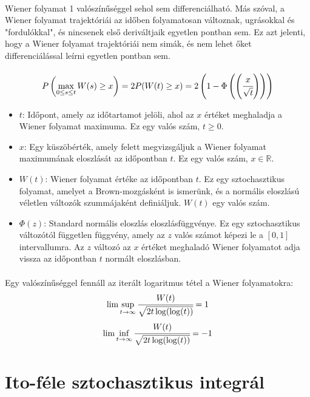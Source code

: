 \documentclass[11pt,a4paper]{article}
\begin{document}
				\paragraph{}
					Wiener folyamat 1 valószínűséggel sehol sem differenciálható. Más szóval, a Wiener folyamat trajektóriái az időben folyamatosan változnak, ugrásokkal és "fordulókkal", és nincsenek első deriváltjaik egyetlen pontban sem. Ez azt jelenti, hogy a Wiener folyamat trajektóriái nem simák, és nem lehet őket differenciálással leírni egyetlen pontban sem.
				\paragraph{}
					$$P\left( \max_{0 \le s \le t} W(s) \ge x\right) = 2P(W(t) \ge x) = 2 \left( 1- \Phi\left(\left( \cfrac{x}{\sqrt{t}} \right)\right) \right) $$
					\begin{itemize}
						\item $t$: Időpont, amely az időtartamot jelöli, ahol az $x$ értéket meghaladja a Wiener folyamat maximuma. Ez egy valós szám, $t \geq 0$.
						\item $x$: Egy küszöbérték, amely felett megvizsgáljuk a Wiener folyamat maximumának eloszlását az időpontban $t$. Ez egy valós szám, $x \in \mathbb{R}$.
						\item $W(t)$: Wiener folyamat értéke az időpontban $t$. Ez egy sztochasztikus folyamat, amelyet a Brown-mozgásként is ismerünk, és a normális eloszlású véletlen változók szummájaként definiáljuk. $W(t)$ egy valós szám.
						\item $\Phi(z)$: Standard normális eloszlás eloszlásfüggvénye. Ez egy sztochasztikus változótól független függvény, amely az $z$ valós számot képezi le a $[0,1]$ intervallumra. Az $z$ változó az $x$ értéket meghaladó Wiener folyamatot adja vissza az időpontban $t$ normált eloszlásban.
					\end{itemize}
				\paragraph{}
					Egy valószínűséggel fennáll az iterált logaritmus tétel a Wiener folyamatokra:
					$$\lim \sup_{t \to \infty} \cfrac{W(t)}{\sqrt{2t \log(\log(t))}} = 1$$
					$$\lim \inf_{t \to \infty} \cfrac{W(t)}{\sqrt{2t \log(\log(t))}} = -1$$
			\section{Ito-féle sztochasztikus integrál}
\end{document}
